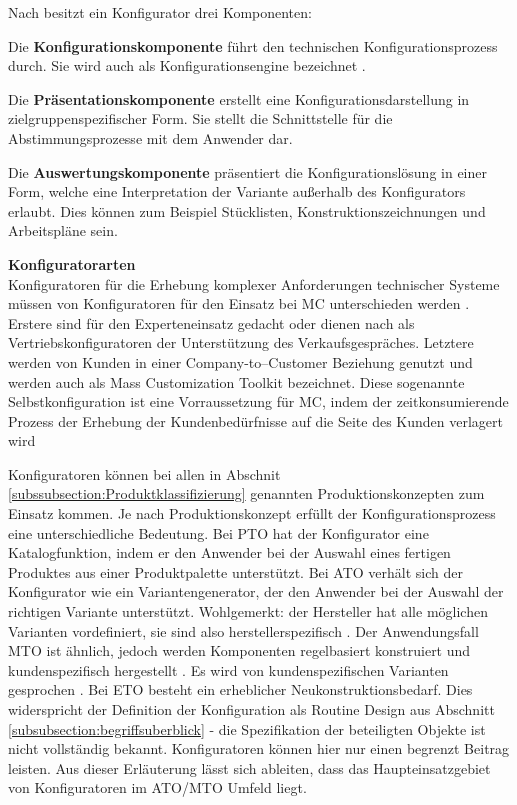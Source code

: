 \documentclass[12pt,a4paper,bibliography=totocnumbered,listof=totoc]{scrartcl}
\begin{document}
Nach \citet{piller06} besitzt ein Konfigurator drei Komponenten:
\begin{compactitem}
\item Die \textbf{Konfigurationskomponente} führt den technischen Konfigurationsprozess durch. Sie wird auch als Konfigurationsengine bezeichnet \citep{tactonProductOverview}.
\item Die \textbf{Präsentationskomponente} erstellt eine Konfigurationsdarstellung in zielgruppenspezifischer Form. Sie stellt die Schnittstelle für die Abstimmungsprozesse mit dem Anwender dar.
\item Die \textbf{Auswertungskomponente} präsentiert die Konfigurationslösung in einer Form, welche eine Interpretation der Variante außerhalb des Konfigurators erlaubt. Dies können zum Beispiel Stücklisten, Konstruktionszeichnungen und Arbeitspläne sein.
\end{compactitem}

\textbf{Konfiguratorarten}\\
Konfiguratoren für die Erhebung komplexer Anforderungen technischer Systeme  müssen von Konfiguratoren für den Einsatz bei \ac{MC} unterschieden werden \citep{felferning14}. Erstere sind für den Experteneinsatz gedacht oder dienen nach \citet{piller06} als Vertriebskonfiguratoren der Unterstützung des Verkaufsgespräches.   Letztere werden von Kunden in einer Company-to–Customer Beziehung genutzt und werden auch als Mass Customization Toolkit bezeichnet. Diese sogenannte Selbstkonfiguration ist eine Vorraussetzung für \ac{MC}, indem der zeitkonsumierende Prozess der Erhebung der Kundenbedürfnisse auf die Seite des Kunden verlagert wird \citep{piller06}

Konfiguratoren können bei allen in Abschnit \ref{subssubsection:Produktklassifizierung} genannten Produktionskonzepten zum Einsatz kommen. Je nach Produktionskonzept erfüllt der Konfigurationsprozess eine unterschiedliche Bedeutung. Bei \ac{PTO} hat der Konfigurator eine Katalogfunktion, indem er den Anwender bei der Auswahl eines fertigen Produktes aus einer Produktpalette unterstützt. Bei \ac{ATO} verhält sich der Konfigurator wie ein Variantengenerator, der den Anwender bei der Auswahl der richtigen Variante unterstützt. Wohlgemerkt: der Hersteller hat alle möglichen Varianten vordefiniert, sie sind also herstellerspezifisch \citep{schomburg80}. Der Anwendungsfall \ac{MTO} ist ähnlich, jedoch werden Komponenten regelbasiert konstruiert und kundenspezifisch hergestellt . Es wird von kundenspezifischen Varianten gesprochen \citep{schomburg80}. Bei \ac{ETO} besteht ein erheblicher Neukonstruktionsbedarf. Dies widerspricht der Definition der Konfiguration als Routine Design aus Abschnitt \ref{subsubsection:begriffsuberblick} - die Spezifikation der beteiligten Objekte ist nicht vollständig bekannt. Konfiguratoren können hier nur einen begrenzt Beitrag leisten. Aus dieser Erläuterung lässt sich ableiten, dass das Haupteinsatzgebiet von Konfiguratoren im \ac{ATO}/\ac{MTO} Umfeld liegt.
\end{document}
